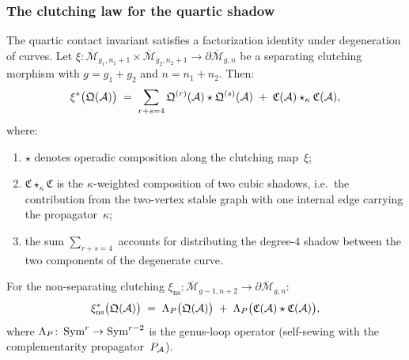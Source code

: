 \subsubsection{The clutching law for the quartic shadow}

\begin{theorem}
The quartic contact invariant satisfies a factorization identity
under degeneration of curves. Let
$\xi\colon \overline{\mathcal{M}}_{g_1,n_1+1} \times
\overline{\mathcal{M}}_{g_2,n_2+1} \to
\partial\overline{\mathcal{M}}_{g,n}$
be a separating clutching morphism with $g = g_1 + g_2$ and
$n = n_1 + n_2$. Then:
\begin{equation}%
\xi^*\bigl(\mathfrak{Q}(\cA)\bigr)
\;=\;
\sum_{r+s=4}
\mathfrak{Q}^{(r)}(\cA) \star \mathfrak{Q}^{(s)}(\cA)
\;+\;
\mathfrak{C}(\cA) \star_\kappa \mathfrak{C}(\cA),
\end{equation}
where:
\begin{enumerate}[label=\textup{(\roman*)}]
\item $\star$ denotes operadic composition along the clutching
 map~$\xi$;
\item $\mathfrak{C} \star_\kappa \mathfrak{C}$ is the
 $\kappa$-weighted composition of two cubic shadows, i.e.\ the
 contribution from the two-vertex stable graph with one internal
 edge carrying the propagator~$\kappa$;
\item the sum $\sum_{r+s=4}$ accounts for distributing the degree-$4$
 shadow between the two components of the degenerate curve.
\end{enumerate}

For the non-separating clutching
$\xi_{\mathrm{ns}}\colon \overline{\mathcal{M}}_{g-1,n+2}
\to \partial\overline{\mathcal{M}}_{g,n}$:
\begin{equation}%
\xi_{\mathrm{ns}}^*\bigl(\mathfrak{Q}(\cA)\bigr)
\;=\;
\Lambda_P\bigl(\mathfrak{Q}(\cA)\bigr)
\;+\;
\Lambda_P\bigl(\mathfrak{C}(\cA) \star \mathfrak{C}(\cA)\bigr),
\end{equation}
where $\Lambda_P\colon \operatorname{Sym}^r \to \operatorname{Sym}^{r-2}$ is the genus-loop
operator (self-sewing with the complementarity propagator~$P_{\mathcal{A}}$).
\end{theorem}


